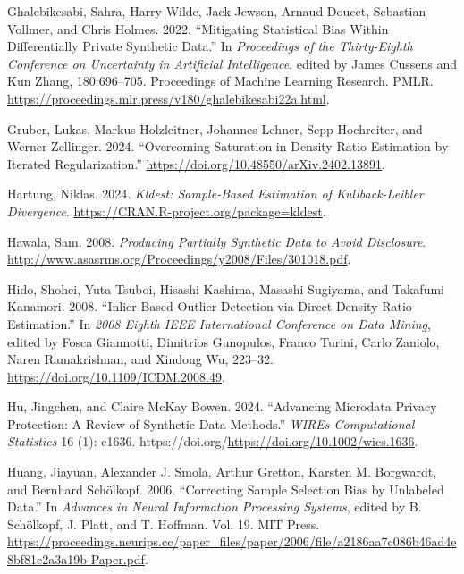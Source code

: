 \documentclass[
]{article}
\newlength{\cslhangindent}
\newenvironment{CSLReferences}[2] %
 {\begin{list}{}{%
  \setlength{\itemindent}{0pt}
  \setlength{\leftmargin}{0pt}
  \setlength{\parsep}{0pt}
  \ifodd #1
   \setlength{\leftmargin}{\cslhangindent}
   \setlength{\itemindent}{-1\cslhangindent}
  \fi
  \setlength{\itemsep}{#2\baselineskip}}}
 {\end{list}}
\begin{document}
\begin{CSLReferences}{1}{0}
Ghalebikesabi, Sahra, Harry Wilde, Jack Jewson, Arnaud Doucet, Sebastian
Vollmer, and Chris Holmes. 2022. {``Mitigating Statistical Bias Within
Differentially Private Synthetic Data.''} In \emph{Proceedings of the
Thirty-Eighth Conference on Uncertainty in Artificial Intelligence},
edited by James Cussens and Kun Zhang, 180:696--705. Proceedings of
Machine Learning Research. PMLR.
\url{https://proceedings.mlr.press/v180/ghalebikesabi22a.html}.

Gruber, Lukas, Markus Holzleitner, Johannes Lehner, Sepp Hochreiter, and
Werner Zellinger. 2024. {``Overcoming Saturation in Density Ratio
Estimation by Iterated Regularization.''}
\url{https://doi.org/10.48550/arXiv.2402.13891}.

Hartung, Niklas. 2024. \emph{Kldest: Sample-Based Estimation of
Kullback-Leibler Divergence}.
\url{https://CRAN.R-project.org/package=kldest}.

Hawala, Sam. 2008. \emph{Producing Partially Synthetic Data to Avoid
Disclosure}.
\url{http://www.asasrms.org/Proceedings/y2008/Files/301018.pdf}.

Hido, Shohei, Yuta Tsuboi, Hisashi Kashima, Masashi Sugiyama, and
Takafumi Kanamori. 2008. {``Inlier-Based Outlier Detection via Direct
Density Ratio Estimation.''} In \emph{2008 Eighth IEEE International
Conference on Data Mining}, edited by Fosca Giannotti, Dimitrios
Gunopulos, Franco Turini, Carlo Zaniolo, Naren Ramakrishnan, and Xindong
Wu, 223--32. \url{https://doi.org/10.1109/ICDM.2008.49}.

Hu, Jingchen, and Claire McKay Bowen. 2024. {``Advancing Microdata
Privacy Protection: A Review of Synthetic Data Methods.''} \emph{WIREs
Computational Statistics} 16 (1): e1636.
https://doi.org/\url{https://doi.org/10.1002/wics.1636}.

Huang, Jiayuan, Alexander J. Smola, Arthur Gretton, Karsten M.
Borgwardt, and Bernhard Schölkopf. 2006. {``Correcting Sample Selection
Bias by Unlabeled Data.''} In \emph{Advances in Neural Information
Processing Systems}, edited by B. Schölkopf, J. Platt, and T. Hoffman.
Vol. 19. MIT Press.
\url{https://proceedings.neurips.cc/paper_files/paper/2006/file/a2186aa7c086b46ad4e8bf81e2a3a19b-Paper.pdf}.


\end{CSLReferences}
\end{document}
